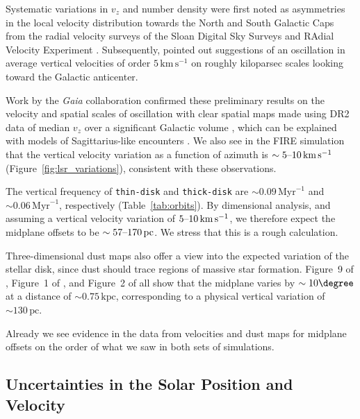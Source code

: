 \documentclass[twocolumn]{aastex62}
\newcommand{\pc}{\text{pc}}
\newcommand{\kpc}{\text{kpc}}
\newcommand{\Myr}{\text{Myr}}
\newcommand{\kms}{\text{km}\,\text{s}^{-1}}
\newcommand{\thin}{\texttt{thin-disk}}
\newcommand{\thick}{\texttt{thick-disk}}
\begin{document}
\label{ssec:mw_data_midplane}

Systematic variations in $v_z$ and number density were first noted as
asymmetries in the local velocity distribution towards the North and South
Galactic Caps from the radial velocity surveys of the Sloan Digital Sky
Surveys \citep{2012ApJ...750L..41W} and RAdial Velocity Experiment
\citep{2013MNRAS.436..101W}. Subsequently, \citet{2013ApJ...777L...5C} pointed
out suggestions of an oscillation in average vertical velocities of order
$5\,\kms$ on roughly kiloparsec scales looking toward the Galactic anticenter.

Work by the \textit{Gaia} collaboration confirmed these preliminary results on
the velocity and spatial scales of oscillation with clear spatial maps made
using DR2 data of median $v_z$ over a significant Galactic volume
\citep{2018A&A...616A..11G, 2019arXiv190209569F}, which can be explained with
models of Sagittarius-like encounters
\citep{2013MNRAS.429..159G,2018MNRAS.481..286L,2019MNRAS.485.3134L}. We also
see in the FIRE simulation that the vertical velocity variation as a function
of azimuth is $\sim5\textup{--}10\,\kms$ (Figure~\ref{fig:lsr_variations}),
consistent with these observations.

The vertical frequency of \thin{} and \thick{} are $\sim 0.09\,\Myr^{-1}$ and
$\sim0.06\,\Myr^{-1}$, respectively (Table~\ref{tab:orbits}). By dimensional
analysis, and assuming a vertical velocity variation of
$5\textup{--}10\,\kms$, we therefore expect the midplane offsets to be $\sim
57\textup{--}170\,\pc$. We stress that this is a rough calculation.

Three-dimensional dust maps also offer a view into the expected variation of
the stellar disk, since dust should trace regions of massive star formation.
Figure~9 of \citet{2019MNRAS.483.4277C}, Figure~1 of
\citet{2019arXiv190105971L}, and Figure~2 of \citet{2019arXiv190502734G} all
show that the midplane varies by $\sim10\degree$ at a distance of
$\sim0.75\,\kpc$, corresponding to a physical vertical variation of
$\sim130\,\pc$.

Already we see evidence in the data from velocities and dust maps for midplane
offsets on the order of what we saw in both sets of simulations.

\subsection{Uncertainties in the Solar Position and Velocity}\label{ssec:coord_off}
\end{document}
